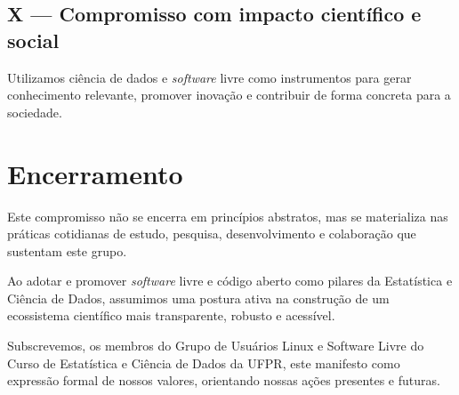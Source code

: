 \documentclass[
  12pt,          %
  a4paper,       %
  oneside,       %
  brazil         %
]{article}
\newenvironment{principio}[1]{%
  \vspace{0.8em}
  \noindent
  \begin{minipage}{\textwidth}
    \subsection*{#1}
    \itshape
}{%
  \end{minipage}
  \vspace{0.5em}
}
\begin{document}
\begin{principio}{X --- Compromisso com impacto científico e social}
Utilizamos ciência de dados e \textit{software} livre como instrumentos para gerar conhecimento relevante, promover inovação e 
contribuir de forma concreta para a sociedade.
\end{principio}

\section*{Encerramento}

Este compromisso não se encerra em princípios abstratos, mas se materializa nas práticas cotidianas de estudo, pesquisa, desenvolvimento e 
colaboração que sustentam este grupo.

Ao adotar e promover \textit{software} livre e código aberto como pilares da Estatística e Ciência de Dados, assumimos uma postura ativa na construção de um ecossistema 
científico mais transparente, robusto e acessível.

Subscrevemos, os membros do Grupo de Usuários Linux e Software Livre do Curso de Estatística e Ciência de Dados da UFPR, 
este manifesto como expressão formal de nossos valores, orientando nossas ações presentes e futuras.

\vspace{2cm}

\end{document}
